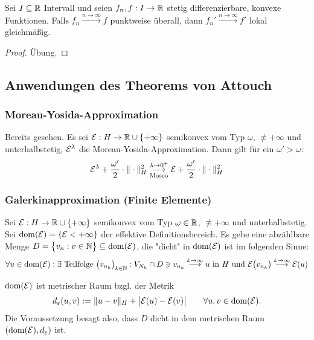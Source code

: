 \begin{lemma}
	Sei $I\subseteq\mathbb{R}$ Intervall und seien $f_n,f:I\to\mathbb{R}$ stetig differenzierbare, konvexe Funktionen.
	Falls $f_n\overset{n\to\infty}{\longrightarrow} f$ punktweise überall,
	dann $f_n'\overset{n\to\infty}{\longrightarrow} f'$ lokal gleichmäßig.
\end{lemma}

\begin{proof}
	Übung.
\end{proof}

\subsection{Anwendungen des Theorems von Attouch} %
\subsubsection{Moreau-Yosida-Approximation}
Bereits gesehen.
Es sei $\mathcal{E}:H\to\mathbb{R}\cup\lbrace+\infty\rbrace$ semikonvex vom Typ $\omega$, $\not\equiv+\infty$ und unterhalbstetig,
$\mathcal{E}^\lambda$ die Moreau-Yosida-Approximation.
Dann gilt für ein $\omega'>\omega$:
\begin{align*}
	\mathcal{E}^\lambda+\frac{\omega'}{2}\cdot\Vert\cdot\Vert_H^2
	\underset{\text{Mosco}}{\overset{\lambda\to 0^+}{\longrightarrow}}
	\mathcal{E}+\frac{\omega'}{2}\cdot\Vert\cdot\Vert_H^2
\end{align*}

\subsubsection{Galerkinapproximation (Finite Elemente)}
Sei $\mathcal{E}:H\to\mathbb{R}\cup\lbrace+\infty\rbrace$ semikonvex vom Typ $\omega\in\mathbb{R}$, $\not\equiv+\infty$ und unterhalbstetig.
Sei $\operatorname{dom}(\mathcal{E})=\lbrace\mathcal{E}<+\infty\rbrace$ der effektive Definitionsbereich.
Es gebe eine abzählbare Menge $D=\big\lbrace v_n:v\in\mathbb{N}\big\rbrace\subseteq\operatorname{dom}(\mathcal{E})$, die "dicht" in $\operatorname{dom}(\mathcal{E})$ ist im folgenden Sinne:
\begin{align*}
	\forall u\in\operatorname{dom}(\mathcal{E}):\exists\text{ Teilfolge }\big(v_{n_k}\big)_{k\in\mathbb{N}}:
	V_{N_k}\cap D\ni v_{n_k}\overset{k\to\infty}{\longrightarrow} u\text{ in }H
	\text{ und }\mathcal{E}\big(v_{n_k}\big)\overset{k\to\infty}{\longrightarrow}\mathcal{E}(u)
\end{align*}

$\operatorname{dom}(\mathcal{E})$ ist metrischer Raum bzgl. der Metrik
\begin{align*}
	d_\varepsilon(u,v):=\Vert u-v\Vert_H+\big|\mathcal{E}(u)-\mathcal{E}(v)\big|\qquad\forall u,v\in\operatorname{dom}(\mathcal{E}).
\end{align*}
Die Voraussetzung besagt also, dass $D$ dicht in dem metrischen Raum $(\operatorname{dom}(\mathcal{E}),d_\varepsilon)$ ist.

